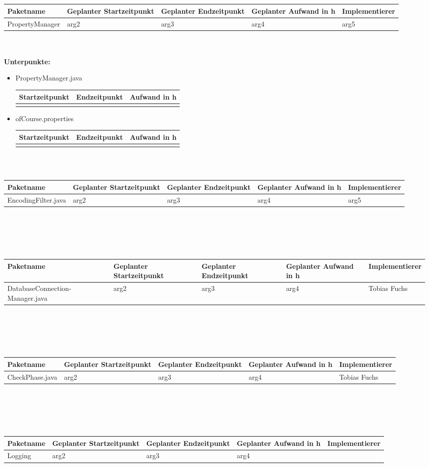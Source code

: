 \documentclass[12pt,a4paper]{scrreprt}
\newcommand{\Arbeitspaket}[5]{	\begin{tabular}{|p{4cm}|p{3cm}|p{3cm}|p{3cm}|p{3cm}|}
		\hline \textbf{Paketname} & \textbf{Geplanter Startzeitpunkt} & \textbf{Geplanter Endzeitpunkt} & \textbf{Geplanter Aufwand in h} & \textbf{Implementierer} \\ 
		\hline #1 & #2  & #3 & #4 & #5 \\ 
		\hline 
	\end{tabular} \ \\
	\ \\}
\begin{document}
	
	\ \\
	\ \\
	\Arbeitspaket{PropertyManager}{arg2}{arg3}{arg4}{arg5}
	\textbf{Unterpunkte:}
	\begin{itemize}
		\item PropertyManager.java\\
		\begin{tabular}{|p{4cm}|p{4cm}|p{4cm}|}
			\hline Startzeitpunkt & Endzeitpunkt & Aufwand in h \\ 
			\hline &      &  \\ 
			\hline 
		\end{tabular}
		\item ofCourse.properties\\
		\begin{tabular}{|p{4cm}|p{4cm}|p{4cm}|}
			\hline Startzeitpunkt & Endzeitpunkt & Aufwand in h \\ 
			\hline &      &  \\ 
			\hline 
		\end{tabular}	
	\end{itemize}
	
	
	\ \\
	\ \\
	\Arbeitspaket{EncodingFilter.java}{arg2}{arg3}{arg4}{arg5}
		
	
	
	\ \\
	\ \\
	\Arbeitspaket{DatabaseConnection- Manager.java}{arg2}{arg3}{arg4}{Tobias Fuchs}
	
	
	\ \\
	\ \\
	\Arbeitspaket{CheckPhase.java}{arg2}{arg3}{arg4}{Tobias Fuchs}
	
	\ \\
	\ \\
	\Arbeitspaket{Logging}{arg2}{arg3}{arg4}{}
	
\end{document}
